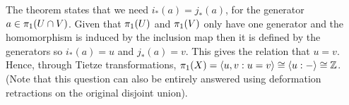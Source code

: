 \documentclass{article}
\begin{document}
\begin{flushleft}
    The theorem states that we need $i_\ast(a) = j_\ast(a)$, for the generator $a \in \pi_1(U \cap V)$. Given that $\pi_1(U)$ and $\pi_1(V)$ only have one generator and the homomorphism is induced by the inclusion map then it is defined by the generators so $i_\ast(a) = u$ and $j_\ast(a) = v$. This gives the relation that $u = v$. Hence, through Tietze transformations, $\pi_1(X) = \langle u, v : u = v \rangle \cong \langle u : - \rangle \cong \mathbb{Z}$. (Note that this question can also be entirely answered using deformation retractions on the original disjoint union).

    
\end{flushleft}
\end{document}

